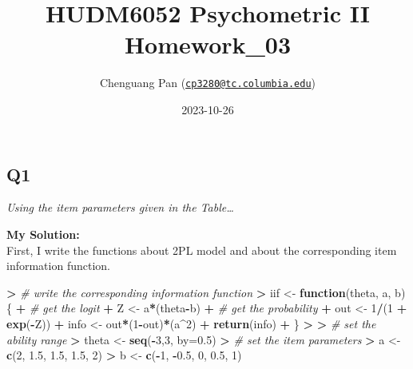 \documentclass[
]{article}
\title{HUDM6052 Psychometric II Homework\_03}
\author{Chenguang Pan
(\href{mailto:cp3280@tc.columbia.edu}{\nolinkurl{cp3280@tc.columbia.edu}})}
\date{2023-10-26}
\newenvironment{Shaded}{\begin{snugshade}}{\end{snugshade}}
\newcommand{\AttributeTok}[1]{\textcolor[rgb]{0.13,0.29,0.53}{#1}}
\newcommand{\CommentTok}[1]{\textcolor[rgb]{0.56,0.35,0.01}{\textit{#1}}}
\newcommand{\ControlFlowTok}[1]{\textcolor[rgb]{0.13,0.29,0.53}{\textbf{#1}}}
\newcommand{\DecValTok}[1]{\textcolor[rgb]{0.00,0.00,0.81}{#1}}
\newcommand{\ErrorTok}[1]{\textcolor[rgb]{0.64,0.00,0.00}{\textbf{#1}}}
\newcommand{\FloatTok}[1]{\textcolor[rgb]{0.00,0.00,0.81}{#1}}
\newcommand{\FunctionTok}[1]{\textcolor[rgb]{0.13,0.29,0.53}{\textbf{#1}}}
\newcommand{\NormalTok}[1]{#1}
\newcommand{\OtherTok}[1]{\textcolor[rgb]{0.56,0.35,0.01}{#1}}
\newcommand{\SpecialCharTok}[1]{\textcolor[rgb]{0.81,0.36,0.00}{\textbf{#1}}}
\begin{document}
\maketitle

\setcounter{tocdepth}{4}
\tableofcontents

\hypertarget{q1}{%
\subsection{Q1}\label{q1}}

\emph{Using the item parameters given in the Table\ldots{}}

\textbf{My Solution:}\\
First, I write the functions about 2PL model and about the corresponding
item information function.

\begin{Shaded}
\begin{Highlighting}[]
\SpecialCharTok{\textgreater{}} \CommentTok{\# write the corresponding information function}
\ErrorTok{\textgreater{}}\NormalTok{ iif }\OtherTok{\textless{}{-}} \ControlFlowTok{function}\NormalTok{(theta, a, b)\{}
\SpecialCharTok{+}   \CommentTok{\# get the logit}
\SpecialCharTok{+}\NormalTok{   Z }\OtherTok{\textless{}{-}}\NormalTok{ a}\SpecialCharTok{*}\NormalTok{(theta}\SpecialCharTok{{-}}\NormalTok{b)}
\SpecialCharTok{+}   \CommentTok{\# get the probability}
\SpecialCharTok{+}\NormalTok{   out }\OtherTok{\textless{}{-}} \DecValTok{1}\SpecialCharTok{/}\NormalTok{(}\DecValTok{1} \SpecialCharTok{+} \FunctionTok{exp}\NormalTok{(}\SpecialCharTok{{-}}\NormalTok{Z))}
\SpecialCharTok{+}\NormalTok{   info }\OtherTok{\textless{}{-}}\NormalTok{ out}\SpecialCharTok{*}\NormalTok{(}\DecValTok{1}\SpecialCharTok{{-}}\NormalTok{out)}\SpecialCharTok{*}\NormalTok{(a}\SpecialCharTok{\^{}}\DecValTok{2}\NormalTok{)}
\SpecialCharTok{+}   \FunctionTok{return}\NormalTok{(info)}
\SpecialCharTok{+}\NormalTok{ \}}
\SpecialCharTok{\textgreater{}} 
\ErrorTok{\textgreater{}} \CommentTok{\# set the ability range}
\ErrorTok{\textgreater{}}\NormalTok{ theta }\OtherTok{\textless{}{-}} \FunctionTok{seq}\NormalTok{(}\SpecialCharTok{{-}}\DecValTok{3}\NormalTok{,}\DecValTok{3}\NormalTok{, }\AttributeTok{by=}\FloatTok{0.5}\NormalTok{)}
\SpecialCharTok{\textgreater{}} \CommentTok{\# set the item parameters}
\ErrorTok{\textgreater{}}\NormalTok{ a }\OtherTok{\textless{}{-}} \FunctionTok{c}\NormalTok{(}\DecValTok{2}\NormalTok{, }\FloatTok{1.5}\NormalTok{, }\FloatTok{1.5}\NormalTok{, }\FloatTok{1.5}\NormalTok{, }\DecValTok{2}\NormalTok{)}
\SpecialCharTok{\textgreater{}}\NormalTok{ b }\OtherTok{\textless{}{-}} \FunctionTok{c}\NormalTok{(}\SpecialCharTok{{-}}\DecValTok{1}\NormalTok{, }\SpecialCharTok{{-}}\FloatTok{0.5}\NormalTok{, }\DecValTok{0}\NormalTok{, }\FloatTok{0.5}\NormalTok{, }\DecValTok{1}\NormalTok{)}

\end{Highlighting}
\end{Shaded}
\end{document}
